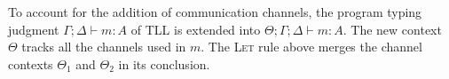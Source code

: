 To account for the addition of communication channels, the program typing judgment
${\Gamma ; \Delta \vdash m : A}$ of TLL is extended into ${\Theta ; \Gamma ; \Delta \vdash m : A}$.
The new context $\Theta$ tracks all the channels used in $m$. The \textsc{Let} rule above merges 
the channel contexts $\Theta_1$ and $\Theta_2$ in its conclusion.





